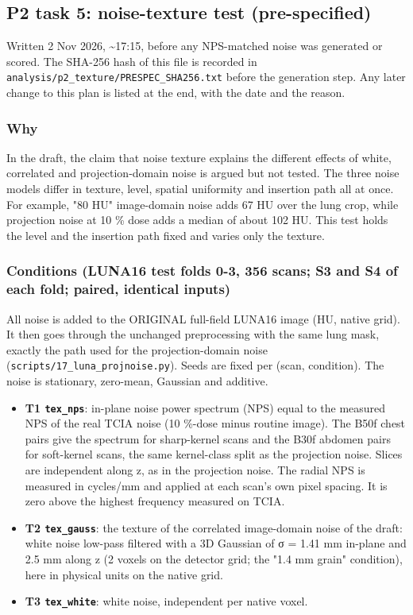 \subsection*{P2 task 5: noise-texture test (pre-specified)}
Written 2 Nov 2026, \textasciitilde{}17:15, before any NPS-matched noise was generated or scored. The SHA-256 hash of this file is recorded in \texttt{analysis/p2\_texture/PRESPEC\_SHA256.txt} before the generation step. Any later change to this plan is listed at the end, with the date and the reason.

\subsubsection*{Why}
In the draft, the claim that noise texture explains the different effects of white, correlated and projection-domain noise is argued but not tested. The three noise models differ in texture, level, spatial uniformity and insertion path all at once. For example, "80 HU" image-domain noise adds 67 HU over the lung crop, while projection noise at 10 \% dose adds a median of about 102 HU. This test holds the level and the insertion path fixed and varies only the texture.

\subsubsection*{Conditions (LUNA16 test folds 0-3, 356 scans; S3 and S4 of each fold; paired, identical inputs)}
All noise is added to the ORIGINAL full-field LUNA16 image (HU, native grid). It then goes through the unchanged preprocessing with the same lung mask, exactly the path used for the projection-domain noise (\texttt{scripts/17\_luna\_projnoise.py}). Seeds are fixed per (scan, condition). The noise is stationary, zero-mean, Gaussian and additive.

\begin{itemize}
\item \textbf{T1 \texttt{tex\_nps}}: in-plane noise power spectrum (NPS) equal to the measured NPS of the real TCIA noise (10 \%-dose minus routine image). The B50f chest pairs give the spectrum for sharp-kernel scans and the B30f abdomen pairs for soft-kernel scans, the same kernel-class split as the projection noise. Slices are independent along z, as in the projection noise. The radial NPS is measured in cycles/mm and applied at each scan's own pixel spacing. It is zero above the highest frequency measured on TCIA.
\item \textbf{T2 \texttt{tex\_gauss}}: the texture of the correlated image-domain noise of the draft: white noise low-pass filtered with a 3D Gaussian of σ = 1.41 mm in-plane and 2.5 mm along z (2 voxels on the detector grid; the "1.4 mm grain" condition), here in physical units on the native grid.
\item \textbf{T3 \texttt{tex\_white}}: white noise, independent per native voxel.
\end{itemize}

